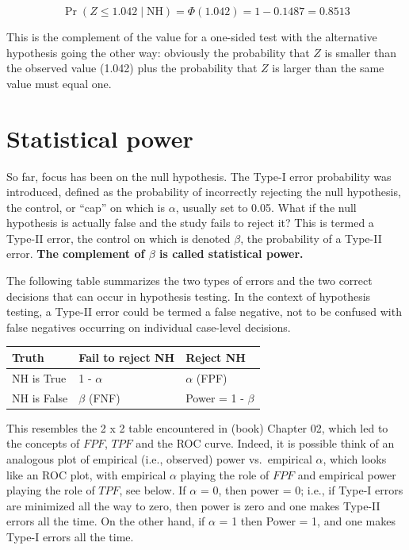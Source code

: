 \documentclass[
]{book}
\begin{document}
\begin{equation*} 
\Pr\left ( Z \leq 1.042 \mid \text{NH}  \right ) = \Phi(1.042) = 1 - 0.1487 = 0.8513
\end{equation*}

This is the complement of the value for a one-sided test with the alternative hypothesis going the other way: obviously the probability that \(Z\) is smaller than the observed value (1.042) plus the probability that \(Z\) is larger than the same value must equal one.

\hypertarget{statistical-power}{%
\section{Statistical power}\label{statistical-power}}

So far, focus has been on the null hypothesis. The Type-I error probability was introduced, defined as the probability of incorrectly rejecting the null hypothesis, the control, or ``cap'' on which is \(\alpha\), usually set to 0.05. What if the null hypothesis is actually false and the study fails to reject it? This is termed a Type-II error, the control on which is denoted \(\beta\), the probability of a Type-II error. \textbf{The complement of \(\beta\) is called statistical power.}

The following table summarizes the two types of errors and the two correct decisions that can occur in hypothesis testing. In the context of hypothesis testing, a Type-II error could be termed a false negative, not to be confused with false negatives occurring on individual case-level decisions.

\begin{longtable}[]{@{}lll@{}}
\toprule
Truth & Fail to reject NH & Reject NH\tabularnewline
\midrule
\endhead
NH is True & 1 - \(\alpha\) & \(\alpha\) (FPF)\tabularnewline
NH is False & \(\beta\) (FNF) & Power = 1 - \(\beta\)\tabularnewline
\bottomrule
\end{longtable}

This resembles the 2 x 2 table encountered in (book) Chapter 02, which led to the concepts of \(FPF\), \(TPF\) and the ROC curve. Indeed, it is possible think of an analogous plot of empirical (i.e., observed) power vs.~empirical \(\alpha\), which looks like an ROC plot, with empirical \(\alpha\) playing the role of \(FPF\) and empirical power playing the role of \(TPF\), see below. If \(\alpha\) = 0, then power = 0; i.e., if Type-I errors are minimized all the way to zero, then power is zero and one makes Type-II errors all the time. On the other hand, if \(\alpha\) = 1 then Power = 1, and one makes Type-I errors all the time.
\end{document}
